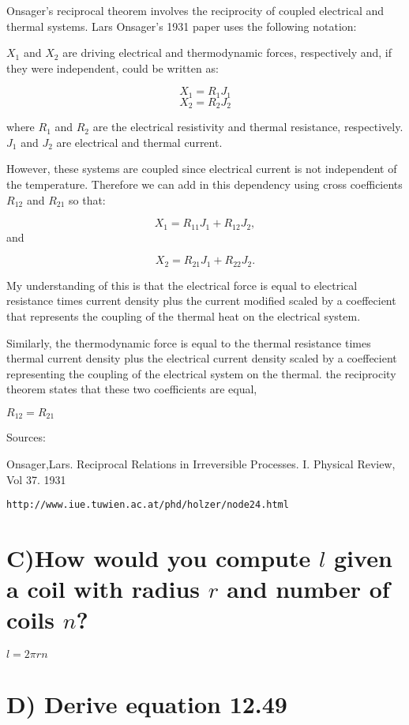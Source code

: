 \documentclass[overlapped,line,letterpaper]{res}
\begin{document}
\begin{resume}
Onsager's reciprocal theorem involves the reciprocity of coupled electrical and thermal systems. Lars Onsager's 1931 paper uses the following notation:


$X_1$ and $X_2$ are driving electrical and thermodynamic forces, respectively and, if they were independent, could be written as:

$$X_1 = R_1J_1$$
$$X_2 = R_2J_2$$


where $R_1$ and $R_2$ are the electrical resistivity and thermal resistance, respectively. $J_1$ and $J_2$ are electrical and thermal current.

However, these systems are coupled since electrical current is not independent of the temperature. Therefore we can add in this dependency using cross coefficients $R_{12}$ and $R_{21}$ so that:

$$X_1 = R_{11}J_1 + R_{12}J_2,$$ and

$$X_2 = R_{21}J_1 + R_{22}J_2.$$ 

My understanding of this is that the electrical force is equal to electrical resistance times current density plus the current modified scaled by a coeffecient that represents the coupling of the thermal heat on the electrical system.

Similarly, the thermodynamic force is equal to the thermal resistance times thermal current density plus the electrical current density scaled by a coeffecient representing the coupling of the electrical system on the thermal. the reciprocity theorem states that these two coefficients are equal,

$R_{12}=R_{21}$

Sources:

Onsager,Lars. Reciprocal Relations in Irreversible Processes. I. Physical Review, Vol 37. 1931

\begin{verbatim}http://www.iue.tuwien.ac.at/phd/holzer/node24.html\end{verbatim} 
\section{C)How would you compute $l$ given a coil with radius $r$ and number of coils $n$?}


$l = 2\pi rn $

\section{D) Derive equation 12.49}


\end{resume}
\end{document}
